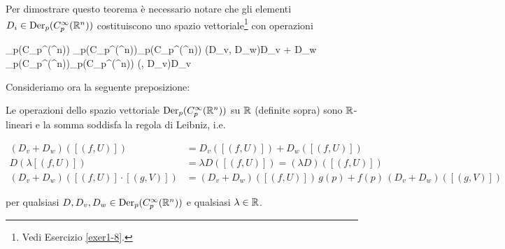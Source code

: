 Per dimostrare questo teorema è necessario notare che gli elementi $ D_{i} \in \operatorname{Der}_{p}(C_{p}^{\infty}(\mathbb{R}^{n})) $ costituiscono uno spazio vettoriale\footnote{%
	Vedi Esercizio \ref{exer1-8}.%
} con operazioni

\map{+}
	{\der_{p}(C_{p}^{\infty}(\R^{n})) \times \der_{p}(C_{p}^{\infty}(\R^{n}))}{\der_{p}(C_{p}^{\infty}(\R^{n}))}
	{(D_{v}, D_{w})}{D_{v} + D_{w}}
%
\map{\cdot}
	{\R \times \der_{p}(C_{p}^{\infty}(\R^{n}))}{\der_{p}(C_{p}^{\infty}(\R^{n}))}
	{(\lambda, D_{v})}{\lambda D_{v}}

Consideriamo ora la seguente preposizione:

\begin{definition}
	Le operazioni dello spazio vettoriale $ \operatorname{Der}_{p}(C_{p}^{\infty}(\mathbb{R}^{n})) $ su $ \mathbb{R} $ (definite sopra) sono $ \mathbb{R} $-lineari e la somma soddisfa la regola di Leibniz, i.e.
	
	\begin{align}
		(D_{v} + D_{w}) ([(f,U)]) &= D_{v}([(f,U)]) + D_{w}([(f,U)]) \\
		D (\lambda [(f,U)]) &= \lambda D ([(f,U)]) = (\lambda D) ([(f,U)]) \\
		(D_{v} + D_{w}) ([(f,U)] \cdot [(g,V)]) &= (D_{v} + D_{w}) ([(f,U)]) \, g(p) + f(p) \, (D_{v} + D_{w}) ([(g,V)])
	\end{align}
	
	per qualsiasi $ D, D_{v}, D_{w} \in \operatorname{Der}_{p}(C_{p}^{\infty}(\mathbb{R}^{n})) $ e qualsiasi $ \lambda \in \mathbb{R} $.
\end{definition}

